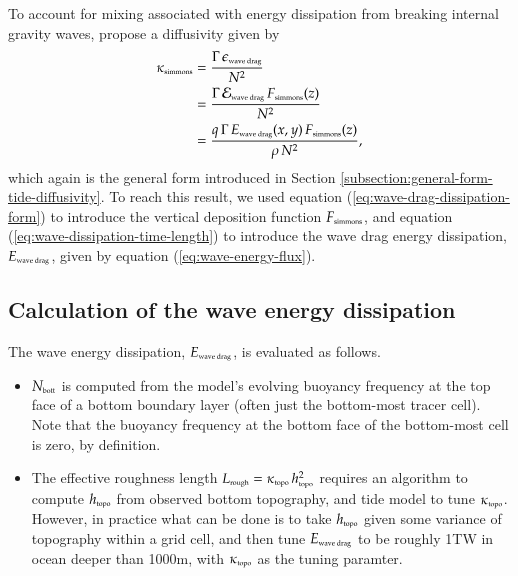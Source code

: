 To account for mixing associated with energy dissipation from breaking
internal gravity waves, \cite{Simmonsetal2004} propose a diffusivity
given by
\begin{subequations}
\begin{align}
 \kappa_{\mbox{\tiny simmons}} &= 
 \frac{\Gamma \, \epsilon_{\mbox{\tiny wave drag}}}{N^{2}}
\\
 &= \frac{\Gamma \, {\cal E}_{\mbox{\tiny wave drag}} \, F_{\mbox{\tiny simmons}}(z)}{N^{2}}
\\
 &=
 \frac{q \, \Gamma \, E_{\mbox{\tiny wave drag}}(x,y) \,  F_{\mbox{\tiny simmons}}(z) }  {\rho \, N^2},
\end{align}
\label{eq:wave-vert-kappa-simmons}
\end{subequations}
which again is the general form introduced in Section
\ref{subsection:general-form-tide-diffusivity}.  To reach this result,
we used equation (\ref{eq:wave-drag-dissipation-form}) to introduce
the vertical deposition function $F_{\mbox{\tiny simmons}}$, and
equation (\ref{eq:wave-dissipation-time-length}) to introduce the wave
drag energy dissipation, $E_{\mbox{\tiny wave drag}}$, given by
equation (\ref{eq:wave-energy-flux}).


\subsection{Calculation of the wave energy dissipation} 
\label{subsection:wave-drag-details-simmons}

The wave energy dissipation, $E_{\mbox{\tiny wave drag}}$, is
evaluated as follows.
\begin{itemize}

\item $N_{\mbox{\tiny bott}}$ is computed from the model's evolving
  buoyancy frequency at the top face of a bottom boundary layer (often
  just the bottom-most tracer cell).  Note that the buoyancy frequency
  at the bottom face of the bottom-most cell is zero, by definition.

\item The effective roughness length $L_{\mbox{\tiny rough}} =
  \kappa_{\mbox{\tiny topo}} \, h_{\mbox{\tiny topo}}^{2}$ requires an
  algorithm to compute $h_{\mbox{\tiny topo}}$ from observed bottom
  topography, and tide model to tune $\kappa_{\mbox{\tiny topo}}$.
  However, in practice what can be done is to take $h_{\mbox{\tiny
      topo}}$ given some variance of topography within a grid cell,
  and then tune $E_{\mbox{\tiny wave drag}}$ to be roughly 1TW in
  ocean deeper than 1000m, with $\kappa_{\mbox{\tiny topo}}$ as the
  tuning paramter.

\end{itemize}


